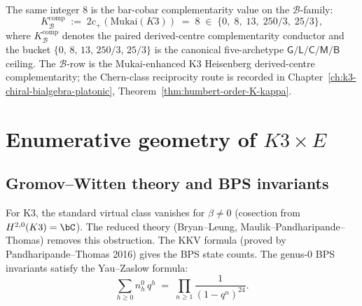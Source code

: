 \begin{remark}[Humbert divisor $H_1$ monodromy order $8 = 2 c_+ \nu(\mu_0)$ with $c_+ = 4$]
The same integer $8$ is the bar-cobar complementarity value on the $\mathcal{B}$-family:
\[
 K_{\mathcal B}^{\mathrm{comp}} \;:=\; 2 c_+(\mathrm{Mukai}(K3)) \;=\; 8 \;\in\; \bigl\{0,\; 8,\; 13,\; 250/3,\; 25/3\bigr\},
\]
where $K_{\mathcal B}^{\mathrm{comp}}$ denotes the paired derived-centre complementarity conductor and the bucket $\{0,\, 8,\, 13,\, 250/3,\, 25/3\}$ is the canonical five-archetype $\mathsf{G}/\mathsf{L}/\mathsf{C}/\mathsf{M}/\mathsf{B}$ ceiling. The $\mathcal{B}$-row is the Mukai-enhanced K3 Heisenberg derived-centre complementarity; the Chern-class reciprocity route is recorded in Chapter~\ref{ch:k3-chiral-bialgebra-platonic}, Theorem~\ref{thm:humbert-order-K-kappa}.
\end{remark}



\section{Enumerative geometry of \texorpdfstring{$K3 \times E$}{K3 x E}}
\label{sec:enum-geom-k3xe}

\subsection{Gromov--Witten theory and BPS invariants}
\label{subsec:gw-bps}

\begin{remark}
\label{rem:gw-k3}
For K3, the standard virtual class vanishes for $\beta \neq 0$
(cosection from $H^{2,0}(K3) = \bC$). The reduced theory
(Bryan--Leung, Maulik--Pandharipande--Thomas) removes this
obstruction. The KKV formula (proved by Pandharipande--Thomas
2016) gives the BPS state counts. The genus-$0$ BPS invariants
satisfy the Yau--Zaslow formula:
\begin{equation}\label{eq:yau-zaslow}
\sum_{h \geq 0} n^0_h\,q^h \;=\; \prod_{n \geq 1}
\frac{1}{(1 - q^n)^{24}}.
\end{equation}
\end{remark}


